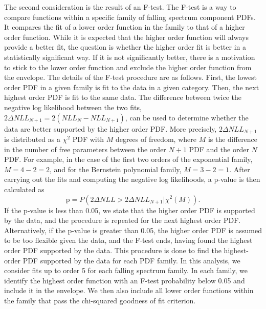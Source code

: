 The second consideration is the result of an F-test. The F-test is a way to compare functions within a specific family of 
falling spectrum component PDFs. It compares the fit of a lower order function in the family to that of a higher order function. 
While it is expected that the higher order function will always provide a better fit, the question is whether the higher order 
fit is better in a statistically significant way. If it is not significantly better, there is a motivation to stick to the lower
order function and exclude the higher order function from the envelope. The details of the F-test procedure are as follows. 
First, the lowest order PDF in a given family is fit to the data in a given
category. Then, the next highest order PDF is fit to the same data. The difference between twice 
the negative log likelihood between the two fits, $2\Delta NLL_{N+1} = 2(NLL_{N}-NLL_{N+1})$, 
can be used to determine whether the data are better supported by the higher order PDF. 
More precisely, $2\Delta NLL_{N+1}$ is distributed as a $\chi^{2}$ PDF with $M$ degrees of 
freedom, where $M$ is the difference in the number of free parameters between the order $N+1$ 
PDF and the order $N$ PDF. For example, in the case of the first two orders of 
the exponential family, $M = 4-2 = 2$, and for the Bernstein polynomial family, $M=3-2=1$. 
After carrying out the fits and computing the negative log likelihoods, a p-value is then 
calculated as 
\begin{equation}
\mathrm{p} = P(2\Delta NLL > 2\Delta NLL_{N+1} | \chi^{2}(M)).
\end{equation}
If the p-value is less than 0.05, we state that the higher order PDF is supported by the 
data, and the procedure is repeated for the next highest order PDF. Alternatively, if the 
p-value is greater than 0.05, the higher order PDF is assumed to be too flexible given 
the data, and the F-test ends, having found the highest order PDF supported by the data.
This procedure is done to find the highest-order PDF supported by the data for each PDF 
family. In this analysis, we consider fits up to order 5 for each falling spectrum family.
In each family, we identify the highest order function with an F-test probability below 0.05 and include it in the envelope. 
We then also include all lower order functions within the family that pass the chi-squared goodness of fit criterion.


